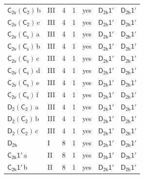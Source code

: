 \documentclass[10pt,a4paper]{article}
\numberwithin{equation}{section}
\newcommand{\grp}[1]{\mathsf{#1}}
\newcommand{\clsletter}[1]{\,{\scriptsize\color{black!55}#1}}
\begin{document}
{\begin{longtable}{@{}llrrlll@{}}
\href{C2v-C2.pdf}{$\grp{C_{2v}}(\grp{C_{2}})$}\clsletter{b} & III & 4 & 1 & yes & \href{D2h-1p.pdf}{$\grp{D_{2h}1'}$} & \href{D2h-1p.pdf}{$\grp{D_{2h}1'}$}\\
\href{C2v-C2.pdf}{$\grp{C_{2v}}(\grp{C_{2}})$}\clsletter{c} & III & 4 & 1 & yes & \href{D2h-1p.pdf}{$\grp{D_{2h}1'}$} & \href{D2h-1p.pdf}{$\grp{D_{2h}1'}$}\\
\href{C2v-C1v.pdf}{$\grp{C_{2v}}(\grp{C_{s}})$}\clsletter{a} & III & 4 & 1 & yes & \href{D2h-1p.pdf}{$\grp{D_{2h}1'}$} & \href{D2h-1p.pdf}{$\grp{D_{2h}1'}$}\\
\href{C2v-C1v.pdf}{$\grp{C_{2v}}(\grp{C_{s}})$}\clsletter{b} & III & 4 & 1 & yes & \href{D2h-1p.pdf}{$\grp{D_{2h}1'}$} & \href{D2h-1p.pdf}{$\grp{D_{2h}1'}$}\\
\href{C2v-C1v.pdf}{$\grp{C_{2v}}(\grp{C_{s}})$}\clsletter{c} & III & 4 & 1 & yes & \href{D2h-1p.pdf}{$\grp{D_{2h}1'}$} & \href{D2h-1p.pdf}{$\grp{D_{2h}1'}$}\\
\href{C2v-C1v.pdf}{$\grp{C_{2v}}(\grp{C_{s}})$}\clsletter{d} & III & 4 & 1 & yes & \href{D2h-1p.pdf}{$\grp{D_{2h}1'}$} & \href{D2h-1p.pdf}{$\grp{D_{2h}1'}$}\\
\href{C2v-C1v.pdf}{$\grp{C_{2v}}(\grp{C_{s}})$}\clsletter{e} & III & 4 & 1 & yes & \href{D2h-1p.pdf}{$\grp{D_{2h}1'}$} & \href{D2h-1p.pdf}{$\grp{D_{2h}1'}$}\\
\href{C2v-C1v.pdf}{$\grp{C_{2v}}(\grp{C_{s}})$}\clsletter{f} & III & 4 & 1 & yes & \href{D2h-1p.pdf}{$\grp{D_{2h}1'}$} & \href{D2h-1p.pdf}{$\grp{D_{2h}1'}$}\\
\href{D2-C2.pdf}{$\grp{D_{2}}(\grp{C_{2}})$}\clsletter{a} & III & 4 & 1 & yes & \href{D2h-1p.pdf}{$\grp{D_{2h}1'}$} & \href{D2h-1p.pdf}{$\grp{D_{2h}1'}$}\\
\href{D2-C2.pdf}{$\grp{D_{2}}(\grp{C_{2}})$}\clsletter{b} & III & 4 & 1 & yes & \href{D2h-1p.pdf}{$\grp{D_{2h}1'}$} & \href{D2h-1p.pdf}{$\grp{D_{2h}1'}$}\\
\href{D2-C2.pdf}{$\grp{D_{2}}(\grp{C_{2}})$}\clsletter{c} & III & 4 & 1 & yes & \href{D2h-1p.pdf}{$\grp{D_{2h}1'}$} & \href{D2h-1p.pdf}{$\grp{D_{2h}1'}$}\\
\href{../../../rotation/data/pdf/D2h.pdf}{$\grp{D_{2h}}$} & I & 8 & 1 & yes & \href{D2h-1p.pdf}{$\grp{D_{2h}1'}$} & \href{D2h-1p.pdf}{$\grp{D_{2h}1'}$}\\
\href{C2h-1p.pdf}{$\grp{C_{2h}1'}$}\clsletter{a} & II & 8 & 1 & yes & \href{D2h-1p.pdf}{$\grp{D_{2h}1'}$} & \href{D2h-1p.pdf}{$\grp{D_{2h}1'}$}\\
\href{C2h-1p.pdf}{$\grp{C_{2h}1'}$}\clsletter{b} & II & 8 & 1 & yes & \href{D2h-1p.pdf}{$\grp{D_{2h}1'}$} & \href{D2h-1p.pdf}{$\grp{D_{2h}1'}$}\\

\end{longtable}}
\end{document}
